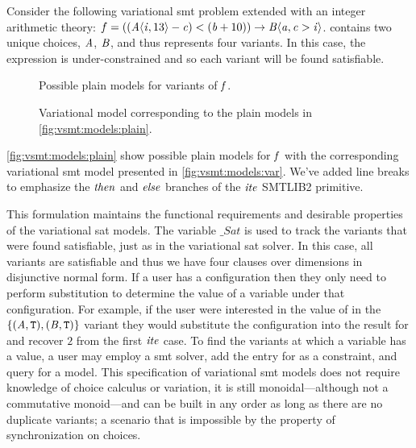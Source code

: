 Consider the following variational \ac{smt} problem extended with an integer
arithmetic theory: $f = ((\chc[A]{\iV{}, 13} - \cV{}) < (\bV + 10)) \rightarrow
\chc[B]{\aV{}, \cV{} > \iV{}}$. \fV{} contains two unique choices, $\mathit{A}$,
$\mathit{B}$, and thus represents four variants. In this case, the expression is
under-constrained and so each variant will be found satisfiable.
% 
\begin{figure}[h]
  \centering
  
  \caption{Possible plain models for variants of $\mathit{f}$.}%
  \label{fig:vsmt:models:plain}
\end{figure}
\begin{figure}[h]
  \centering
  
  \caption{Variational model corresponding to the plain models in
    \autoref{fig:vsmt:models:plain}.}%
  \label{fig:vsmt:models:var}
\end{figure}

\autoref{fig:vsmt:models:plain} show possible plain models for $\mathit{f}$ with the
corresponding variational \ac{smt} model presented in
\autoref{fig:vsmt:models:var}. We've added line breaks to emphasize the
$\mathit{then}$ and $\mathit{else}$ branches of the $\mathit{ite}$ SMTLIB2 primitive. 

This formulation maintains the functional requirements and desirable properties
of the variational \ac{sat} models. The variable $\_Sat$ is used to track the
variants that were found satisfiable, just as in the variational \ac{sat}
solver. In this case, all variants are satisfiable and thus we have four clauses
over dimensions in disjunctive normal form. If a user has a configuration then
they only need to perform substitution to determine the value of a variable
under that configuration. For example, if the user were interested in the value
of \iV{} in the $\{(\mathit{A}{}, \texttt{T}{}), (\mathit{B}{}, \texttt{T}{})\}$ variant they would
substitute the configuration into the result for \iV{} and recover $2$ from the
first $\mathit{ite}$ case. To find the variants at which a variable has a value, a
user may employ a \ac{smt} solver, add the entry for \iV{} as a constraint, and
query for a model.
%
This specification of variational \ac{smt} models does not require knowledge of
choice calculus or variation, it is still monoidal---although not a commutative
monoid---and can be built in any order as long as there are no duplicate
variants; a scenario that is impossible by the property of synchronization on
choices.


